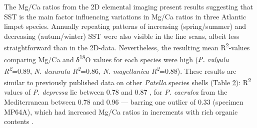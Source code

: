\documentclass[
  authoryear,
  preprint,
  3p]{elsarticle}
\begin{document}
The Mg/Ca ratios from the 2D elemental imaging present results
suggesting that SST is the main factor influencing variations in Mg/Ca
ratios in three Atlantic limpet species. Annually repeating patterns of
increasing (spring/summer) and decreasing (autum/winter) SST were also
visible in the line scans, albeit less straightforward than in the
2D-data. Nevertheless, the resulting mean R\textsuperscript{2}-values
comparing Mg/Ca and δ\textsuperscript{18}O values for each species were
high (\emph{P. vulgata R\textsuperscript{2}}=0.89, \emph{N. deaurata
R\textsuperscript{2}}=0.86\emph{, N. magellanica
R\textsuperscript{2}}=0.88). These results are similar to previously
published data on other \emph{Patella} species shells (Table
\hyperref[Table_2]{2}): R\textsuperscript{2} values of \emph{P.
depressa} lie between 0.78 and 0.87 \citep{Garcia-Escarzaga2021-ij}, for
\emph{P. caerulea} from the Mediterranean between 0.78 and 0.96 ---
barring one outlier of 0.33 (specimen MP64A), which had increased Mg/Ca
ratios in increments with rich organic contents \citep{Hausmann2019-fi}.

\label{Table_2}
\fontsize{8pt}{8pt}\selectfont
\end{document}
